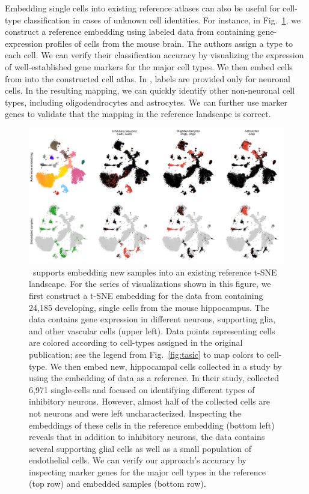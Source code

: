 \documentclass[article]{jss}
\newcommand{\opentsne}{\pkg{openTSNE}}
\begin{document}
Embedding single cells into existing reference atlases can also be useful for
cell-type classification in cases of unknown cell identities. For instance, in
Fig.~\ref{fig:transform}, we construct a reference embedding using labeled data
from \citet{hochgerner2018conserved} containing
gene-expression profiles of cells from the mouse brain. The authors assign a
type to each cell. We can verify their classification accuracy by visualizing
the expression of well-established gene markers for the major cell types. We
then embed cells from \citet{harris2018classes} into the
constructed cell atlas. In \citet{harris2018classes}, labels are provided only for
neuronal cells. In the resulting mapping, we can quickly identify other
non-neuronal cell types, including oligodendrocytes and astrocytes. We can
further use marker genes to validate that the mapping in the reference landscape
is correct. 

\begin{figure}[htbp]
  \includegraphics[width=\textwidth]{transform_hochgerner}
  \caption{\label{fig:transform}
  \opentsne\ supports embedding new samples into an existing reference t-SNE
  landscape. For the series of visualizations shown in this figure, we
  first construct a t-SNE embedding for the data from 
  \citet{hochgerner2018conserved} containing 24,185
  developing, single cells from the mouse hippocampus. The data contains
  gene expression in different neurons, supporting glia, and other
  vascular cells (upper left). Data points representing cells are colored
  according to cell-types assigned in the original publication; see the
  legend from Fig.~\ref{fig:tasic} to map colors to cell-type. We then
  embed new, hippocampal cells collected in a study by
  \citet{harris2018classes} using the embedding of \citet{hochgerner2018conserved}
  data as a reference. In their study, \citet{harris2018classes}
  collected 6,971 single-cells and focused on identifying different
  types of inhibitory neurons. However, almost half of the collected cells
  are not neurons and were left uncharacterized. Inspecting the embeddings
  of these cells in the reference embedding (bottom left) reveals that in
  addition to inhibitory neurons, the data contains several supporting
  glial cells as well as a small population of endothelial cells. We can
  verify our approach's accuracy by inspecting marker genes for the major
  cell types in the reference (top row) and embedded samples (bottom row).
}
\end{figure}
\end{document}
